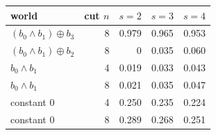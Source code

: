 \begin{tabular}{lrrrr}
\toprule
world & cut $n$ & $s=2$ & $s=3$ & $s=4$ \\
\midrule
$(b_0\wedge b_1)\oplus b_3$ & 8 & 0.979 & 0.965 & 0.953 \\
$(b_0\wedge b_1)\oplus b_2$ & 8 & 0 & 0.035 & 0.060 \\
$b_0\wedge b_1$ & 4 & 0.019 & 0.033 & 0.043 \\
$b_0\wedge b_1$ & 8 & 0.021 & 0.035 & 0.047 \\
constant $0$ & 4 & 0.250 & 0.235 & 0.224 \\
constant $0$ & 8 & 0.289 & 0.268 & 0.251 \\
\bottomrule
\end{tabular}
